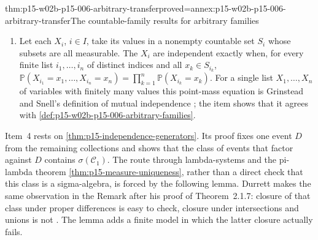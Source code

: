 \begin{hbtheorem}{thm:p15-w02b-p15-006-arbitrary-transfer}{proved=annex:p15-w02b-p15-006-arbitrary-transfer}{The countable-family results for arbitrary families}
\begin{enumerate}
\item Let each \(X_i\), \(i\in I\), take its values in a nonempty
      countable set \(S_i\) whose subsets are all measurable. The
      \(X_i\) are independent exactly when, for every finite list
      \(i_1,\ldots,i_n\) of distinct indices and all
      \(x_k\in S_{i_k}\),
      \(\mathbb P(X_{i_1}=x_1,\ldots,X_{i_n}=x_n)
      =\prod_{k=1}^n\mathbb P(X_{i_k}=x_k)\).
      For a single list \(X_1,\ldots,X_n\) of variables with finitely
      many values this point-mass equation is Grinstead and Snell's
      definition of mutual independence
      \cite[sec.~4.1, Definition~4.4, p.~143]{GrinsteadSnellChance2006};
      the item shows that it agrees with
      \cref{def:p15-w02b-p15-006-arbitrary-families}.
\end{enumerate}
\end{hbtheorem}

Item~4 rests on \cref{thm:p15-independence-generators}. Its proof
fixes one event \(D\) from the remaining collections and shows that
the class of events that factor against \(D\) contains
\(\sigma(\mathcal C_1)\). The route through lambda-systems and the
pi-lambda theorem \cref{thm:p15-measure-uniqueness}, rather than a
direct check that this class is a sigma-algebra, is forced by the
following lemma. Durrett makes the same observation in the Remark after
his proof of Theorem~2.1.7: closure of that class under proper
differences is easy to check, closure under intersections and unions is
not \cite[p.~47]{DurrettPTEAuthor2019}. The lemma adds a finite model
in which the latter closure actually fails.

